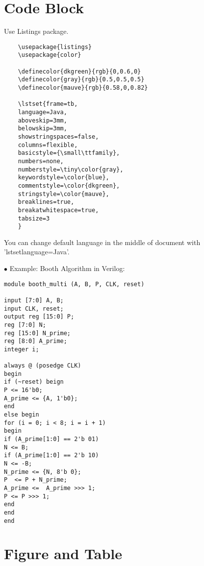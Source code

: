 \documentclass[12pt,a4paper]{article} %
\theoremstyle{definition}
\theoremstyle{remark}
\begin{document}
    \title{\rmfamily\normalfont{}}
    \author{, \spacedlowsmallcaps{}}
    \date{} %
    
    \maketitle
    
       
 
 \newpage
    \section{Code Block}

Use Listings package.
\begin{lstlisting}
	\usepackage{listings}
	\usepackage{color}
	
	\definecolor{dkgreen}{rgb}{0,0.6,0}
	\definecolor{gray}{rgb}{0.5,0.5,0.5}
	\definecolor{mauve}{rgb}{0.58,0,0.82}
	
	\lstset{frame=tb,
	language=Java,
	aboveskip=3mm,
	belowskip=3mm,
	showstringspaces=false,
	columns=flexible,
	basicstyle={\small\ttfamily},
	numbers=none,
	numberstyle=\tiny\color{gray},
	keywordstyle=\color{blue},
	commentstyle=\color{dkgreen},
	stringstyle=\color{mauve},
	breaklines=true,
	breakatwhitespace=true,
	tabsize=3
	}
\end{lstlisting}

You can change default language in the middle of document with 'lstset{language=Java}'.



 $\bullet$ Example:  Booth Algorithm in Verilog:

\begin{lstlisting}
module booth_multi (A, B, P, CLK, reset)

input [7:0] A, B;
input CLK, reset;
output reg [15:0] P;
reg [7:0] N;
reg [15:0] N_prime; 
reg [8:0] A_prime;
integer i;

always @ (posedge CLK)
begin
if (~reset) beign
P <= 16'b0;
A_prime <= {A, 1'b0};
end
else begin
for (i = 0; i < 8; i = i + 1)
begin
if (A_prime[1:0] == 2'b 01)
N <= B;
if (A_prime[1:0] == 2'b 10)
N <= -B;
N_prime <= {N, 8'b 0};
P  <= P + N_prime;
A_prime <= 	A_prime >>> 1;
P <= P >>> 1;
end
end		
end

\end{lstlisting}





\section{Figure and Table}



    
%    
%    
\end{document}
